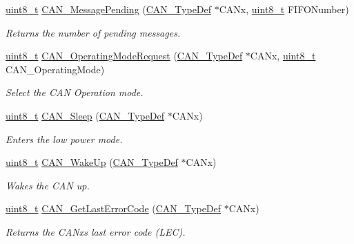 \begin{DoxyCompactItemize}
\hyperlink{_p_e___types_8h_aba7bc1797add20fe3efdf37ced1182c5}{uint8\+\_\+t} \hyperlink{group___c_a_n___private___functions_ga7100459a95ce1b3cfe8ab15e112029fe}{C\+A\+N\+\_\+\+Message\+Pending} (\hyperlink{struct_c_a_n___type_def}{C\+A\+N\+\_\+\+Type\+Def} $\ast$C\+A\+Nx, \hyperlink{_p_e___types_8h_aba7bc1797add20fe3efdf37ced1182c5}{uint8\+\_\+t} F\+I\+F\+O\+Number)
\begin{DoxyCompactList}\small\item\em Returns the number of pending messages. \end{DoxyCompactList}\item 
\hyperlink{_p_e___types_8h_aba7bc1797add20fe3efdf37ced1182c5}{uint8\+\_\+t} \hyperlink{group___c_a_n___private___functions_gab2a3630e9e3024114eb117d14e514208}{C\+A\+N\+\_\+\+Operating\+Mode\+Request} (\hyperlink{struct_c_a_n___type_def}{C\+A\+N\+\_\+\+Type\+Def} $\ast$C\+A\+Nx, \hyperlink{_p_e___types_8h_aba7bc1797add20fe3efdf37ced1182c5}{uint8\+\_\+t} C\+A\+N\+\_\+\+Operating\+Mode)
\begin{DoxyCompactList}\small\item\em Select the C\+AN Operation mode. \end{DoxyCompactList}\item 
\hyperlink{_p_e___types_8h_aba7bc1797add20fe3efdf37ced1182c5}{uint8\+\_\+t} \hyperlink{group___c_a_n___private___functions_ga640215e38765759d7eceb8a039046667}{C\+A\+N\+\_\+\+Sleep} (\hyperlink{struct_c_a_n___type_def}{C\+A\+N\+\_\+\+Type\+Def} $\ast$C\+A\+Nx)
\begin{DoxyCompactList}\small\item\em Enters the low power mode. \end{DoxyCompactList}\item 
\hyperlink{_p_e___types_8h_aba7bc1797add20fe3efdf37ced1182c5}{uint8\+\_\+t} \hyperlink{group___c_a_n___private___functions_ga78cdfbf1884b9e33c552bcbca15bed10}{C\+A\+N\+\_\+\+Wake\+Up} (\hyperlink{struct_c_a_n___type_def}{C\+A\+N\+\_\+\+Type\+Def} $\ast$C\+A\+Nx)
\begin{DoxyCompactList}\small\item\em Wakes the C\+AN up. \end{DoxyCompactList}\item 
\hyperlink{_p_e___types_8h_aba7bc1797add20fe3efdf37ced1182c5}{uint8\+\_\+t} \hyperlink{group___c_a_n___private___functions_gaaee721a392b6b21bfd15dc160aeb6924}{C\+A\+N\+\_\+\+Get\+Last\+Error\+Code} (\hyperlink{struct_c_a_n___type_def}{C\+A\+N\+\_\+\+Type\+Def} $\ast$C\+A\+Nx)
\begin{DoxyCompactList}\small\item\em Returns the C\+A\+Nx\textquotesingle{}s last error code (L\+EC). \end{DoxyCompactList}\item 

\end{DoxyCompactItemize}
